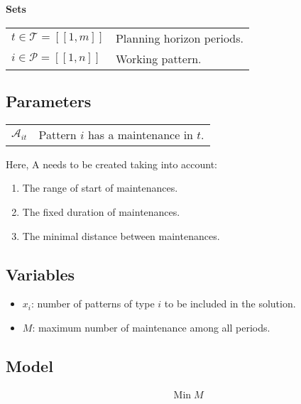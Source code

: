 \documentclass[a4paper,11pt]{article}
\begin{document}
    \textbf{Sets}

    \begin{tabular}{ll}
    $t\in \mathcal{T} = [\![1, m]\!]$ & Planning horizon periods. \\
    $i \in \mathcal{P} = [\![1, n]\!]$ & Working pattern.\\
    \end{tabular}

    \vskip 0.3cm

    \subsection{Parameters}

    \begin{tabular}{ll}
        $\mathcal{A}_{it}$ & Pattern $i$ has a maintenance in $t$.\\
    \end{tabular}

    \vskip 0.3cm

    Here, A needs to be created taking into account:

    \begin{enumerate}
        \item The range of start of maintenances.
        \item The fixed duration of maintenances.
        \item The minimal distance between maintenances.
    \end{enumerate}

    \subsection{Variables}

    \begin{itemize}
        \item $x_i$: number of patterns of type $i$ to be included in the solution.
        \item $M$: maximum number of maintenance among all periods.
    \end{itemize}

    \subsection{Model}

    \begin{align}
        & \text{Min}\; M
    \end{align}
\end{document}
